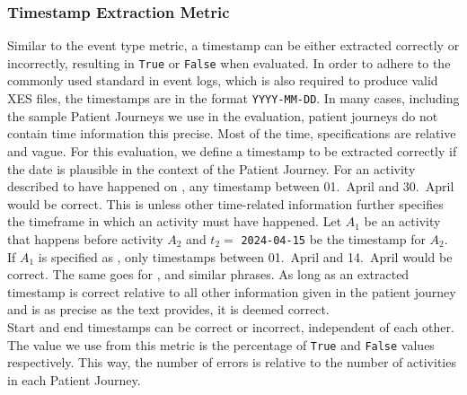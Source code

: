 \subsubsection{Timestamp Extraction Metric}\label{sec:time_metrics}
Similar to the event type metric, a timestamp can be either extracted correctly or incorrectly, resulting in \verb|True| or \verb|False| when evaluated. In order to adhere to the commonly used standard in event logs, which is also required to produce valid XES files, the timestamps are in the format \verb|YYYY-MM-DD|. In many cases, including the sample Patient Journeys we use in the evaluation, patient journeys do not contain time information this precise. Most of the time, specifications are relative and vague. For this evaluation, we define a timestamp to be extracted correctly if the date is plausible in the context of the Patient Journey. For an activity described to have happened on , any timestamp between 01.~April and 30.~April would be correct. This is unless other time-related information further specifies the timeframe in which an activity must have happened. Let $A_1$ be an activity that happens before activity $A_2$ and $t_2=$ \verb|2024-04-15| be the timestamp for $A_2$. If $A_1$ is specified as , only timestamps between 01.~April and 14.~April would be correct. The same goes for ,  and similar phrases. As long as an extracted timestamp is correct relative to all other information given in the patient journey and is as precise as the text provides, it is deemed correct.\\
Start and end timestamps can be correct or incorrect, independent of each other. The value we use from this metric is the percentage of \verb|True| and \verb|False| values respectively. This way, the number of errors is relative to the number of activities in each Patient Journey.

